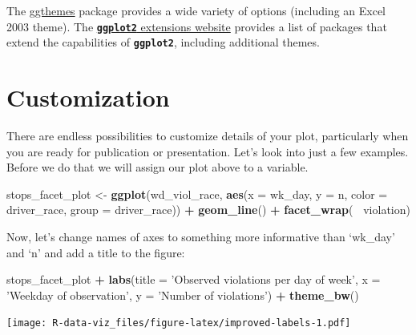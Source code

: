 \documentclass[]{book}
\newenvironment{Shaded}{\begin{snugshade}}{\end{snugshade}}
\newcommand{\KeywordTok}[1]{\textcolor[rgb]{0.13,0.29,0.53}{\textbf{#1}}}
\newcommand{\DataTypeTok}[1]{\textcolor[rgb]{0.13,0.29,0.53}{#1}}
\newcommand{\StringTok}[1]{\textcolor[rgb]{0.31,0.60,0.02}{#1}}
\newcommand{\OperatorTok}[1]{\textcolor[rgb]{0.81,0.36,0.00}{\textbf{#1}}}
\newcommand{\NormalTok}[1]{#1}
\theoremstyle{definition}
\theoremstyle{definition}
\theoremstyle{definition}
\theoremstyle{remark}
\begin{document}
The
\href{https://cran.r-project.org/web/packages/ggthemes/vignettes/ggthemes.html}{ggthemes}
package provides a wide variety of options (including an Excel 2003
theme). The
\href{http://www.ggplot2-exts.org/gallery/}{\textbf{\texttt{ggplot2}}
extensions website} provides a list of packages that extend the
capabilities of \textbf{\texttt{ggplot2}}, including additional themes.

\section{Customization}\label{customization}

There are endless possibilities to customize details of your plot,
particularly when you are ready for publication or presentation. Let's
look into just a few examples. Before we do that we will assign our plot
above to a variable.

\begin{Shaded}
\begin{Highlighting}[]
\NormalTok{stops_facet_plot <-}\StringTok{ }\KeywordTok{ggplot}\NormalTok{(wd_viol_race, }\KeywordTok{aes}\NormalTok{(}\DataTypeTok{x =}\NormalTok{ wk_day, }\DataTypeTok{y =}\NormalTok{ n, }\DataTypeTok{color =}\NormalTok{ driver_race, }\DataTypeTok{group =}\NormalTok{ driver_race)) }\OperatorTok{+}
\StringTok{  }\KeywordTok{geom_line}\NormalTok{() }\OperatorTok{+}\StringTok{ }
\StringTok{  }\KeywordTok{facet_wrap}\NormalTok{(}\OperatorTok{~}\StringTok{ }\NormalTok{violation)}
\end{Highlighting}
\end{Shaded}

Now, let's change names of axes to something more informative than
`wk\_day' and `n' and add a title to the figure:

\begin{Shaded}
\begin{Highlighting}[]
\NormalTok{stops_facet_plot }\OperatorTok{+}
\StringTok{  }\KeywordTok{labs}\NormalTok{(}\DataTypeTok{title =} \StringTok{'Observed violations per day of week'}\NormalTok{,}
         \DataTypeTok{x =} \StringTok{'Weekday of observation'}\NormalTok{,}
         \DataTypeTok{y =} \StringTok{'Number of violations'}\NormalTok{) }\OperatorTok{+}
\StringTok{  }\KeywordTok{theme_bw}\NormalTok{()}
\end{Highlighting}
\end{Shaded}

\texttt{[image: R-data-viz\_files/figure-latex/improved-labels-1.pdf]}
\end{document}
